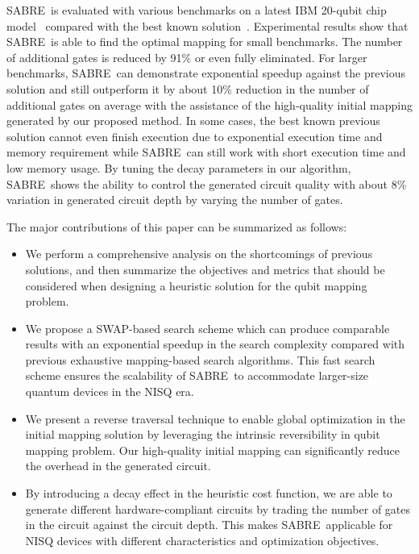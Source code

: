 \documentclass[journal,10pt,twocolumn]{IEEEtran}
\newcommand{\myalgorithmname}{SABRE}
\begin{document}
\myalgorithmname~is evaluated with various benchmarks on a latest IBM 20-qubit chip model~\cite{IBMdevice} compared with the best known solution~\cite{zulehner2018efficient}. 
Experimental results show that \myalgorithmname~is able to find the optimal mapping for small benchmarks.
The number of additional gates is reduced by 91\% or even fully eliminated.
For larger benchmarks, \myalgorithmname~can demonstrate exponential speedup against the previous solution and still outperform it by about 10\% reduction in the number of additional gates on average with the assistance of the high-quality initial mapping generated by our proposed method.
In some cases, the best known previous solution cannot even finish execution due to exponential execution time and memory requirement while \myalgorithmname~can still work with short execution time and low memory usage. 
By tuning the decay parameters in our algorithm, \myalgorithmname~shows the ability to control the generated circuit quality with about 8\% variation in generated circuit depth by varying the number of gates.

The major contributions of this paper can be summarized as follows:
\begin{itemize}
\item We perform a comprehensive analysis on the shortcomings of previous solutions, and then summarize the objectives and metrics that should be considered when designing a heuristic solution for the qubit mapping problem. 

\item We propose a SWAP-based search scheme which can produce comparable results with an exponential speedup in the search complexity compared with previous exhaustive mapping-based search algorithms.
This fast search scheme ensures the scalability of \myalgorithmname~to accommodate larger-size quantum devices in the NISQ era. 

\item We present a reverse traversal technique to enable global optimization in the initial mapping solution by leveraging the intrinsic reversibility in qubit mapping problem. Our high-quality initial mapping can significantly reduce the overhead in the generated circuit. 

\item By introducing a decay effect in the heuristic cost function, we are able to generate different hardware-compliant circuits by trading the number of gates in the circuit against the circuit depth.
This makes \myalgorithmname~applicable for NISQ devices with different characteristics and optimization objectives.
\end{itemize}
\end{document}
